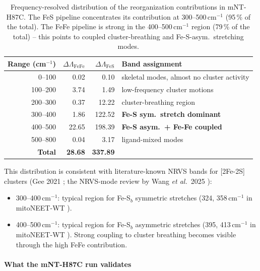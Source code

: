 \documentclass[11pt,a4paper,twoside]{article}
\theoremstyle{remark}
\begin{document}
\begin{table}[h]
\centering
\small
\begin{tabular}{|r|r|r|l|}
\hline
\textbf{Range (cm$^{-1}$)} & $\Delta\Lambda_\text{FeFe}$ &
  $\Delta\Lambda_\text{FeS}$ & \textbf{Band assignment} \\
\hline
0--100   & 0.02   & 0.10    & skeletal modes, almost no cluster activity \\
100--200 & 3.74   & 1.49    & low-frequency cluster motions \\
200--300 & 0.37   & 12.22   & cluster-breathing region \\
300--400 & 1.86   & 122.52  & \textbf{Fe-S sym.\ stretch dominant} \\
400--500 & 22.65  & 198.39  & \textbf{Fe-S asym.\ + Fe-Fe coupled} \\
500--800 & 0.04   & 3.17    & ligand-mixed modes \\
\hline
\textbf{Total} & \textbf{28.68} & \textbf{337.89} & \\
\hline
\end{tabular}
\caption{Frequency-resolved distribution of the reorganization
contributions in mNT-H87C. The FeS pipeline concentrates its
contribution at 300--500\,cm$^{-1}$ (95\,\% of the total). The
FeFe pipeline is strong in the 400--500\,cm$^{-1}$ region (79\,\%
of the total) -- this points to coupled cluster-breathing and
Fe-S-asym.\ stretching modes.}
\label{tab:val-mNT-frequenz}
\end{table}

This distribution is consistent with literature-known NRVS bands
for [2Fe-2S] clusters (Gee 2021 \cite{Gee2021}; the NRVS-mode
review by Wang \emph{et al.}\ 2025 \cite{Wang2025}):
\begin{itemize}\setlength{\itemsep}{0pt}
  \item 300--400\,cm$^{-1}$: typical region for Fe-S$_b$
        symmetric stretches (324, 358\,cm$^{-1}$ in mitoNEET-WT
        \cite{Gee2021}).
  \item 400--500\,cm$^{-1}$: typical region for Fe-S$_b$
        asymmetric stretches (395, 413\,cm$^{-1}$ in mitoNEET-WT
        \cite{Gee2021}). Strong coupling to cluster breathing
        becomes visible through the high FeFe contribution.
\end{itemize}

\paragraph{What the mNT-H87C run validates}
\end{document}
